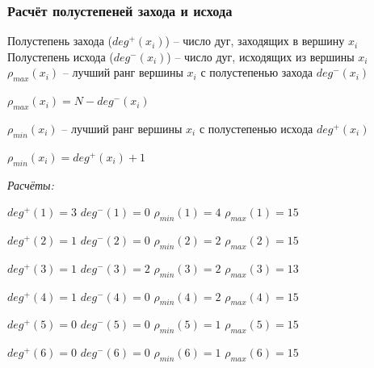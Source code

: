\documentclass[14pt,fleqn]{extarticle}
\begin{document}
	\subsubsection*{Расчёт полустепеней захода и исхода}
	Полустепень захода ($deg^+(x_i)$) -- число дуг, заходящих в вершину $x_i$\\
	Полустепень исхода ($deg^-(x_i)$) -- число дуг, исходящих из вершины $x_i$\\
	
	$\rho_{max}(x_i)$ -- лучший ранг вершины $x_i$ с полустепенью захода $deg^-(x_i)$
	\begin{center}
		$\rho_{max}(x_i) = N - deg^-(x_i)$
	\end{center}
	$\rho_{min}(x_i)$ -- лучший ранг вершины $x_i$ с полустепенью исхода $deg^+(x_i)$
	\begin{center}
		$\rho_{min}(x_i) = deg^+(x_i) + 1$
	\end{center}

	\textit{Расчёты:}
	
	$deg^+(1) = 3$ \hspace{0.55cm} $deg^-(1) = 0$ \hspace{0.55cm} $\rho_{min}(1) = 4$ \hspace{0.55cm} $\rho_{max}(1) = 15$

	$deg^+(2) = 1$ \hspace{0.55cm} $deg^-(2) = 0$ \hspace{0.55cm} $\rho_{min}(2) = 2$ \hspace{0.55cm} $\rho_{max}(2) = 15$
	
	$deg^+(3) = 1$ \hspace{0.55cm} $deg^-(3) = 2$ \hspace{0.55cm} $\rho_{min}(3) = 2$ \hspace{0.55cm} $\rho_{max}(3) = 13$
	
	$deg^+(4) = 1$ \hspace{0.55cm} $deg^-(4) = 0$ \hspace{0.55cm} $\rho_{min}(4) = 2$ \hspace{0.55cm} $\rho_{max}(4) = 15$
	
	$deg^+(5) = 0$ \hspace{0.55cm} $deg^-(5) = 0$ \hspace{0.55cm} $\rho_{min}(5) = 1$ \hspace{0.55cm} $\rho_{max}(5) = 15$
	
	$deg^+(6) = 0$ \hspace{0.55cm} $deg^-(6) = 0$ \hspace{0.55cm} $\rho_{min}(6) = 1$ \hspace{0.55cm} $\rho_{max}(6) = 15$
	
\end{document}
